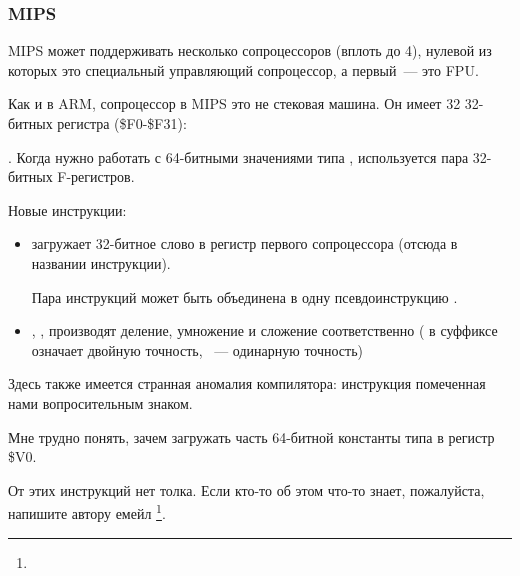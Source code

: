 \subsubsection{MIPS}

MIPS может поддерживать несколько сопроцессоров (вплоть до 4), нулевой из которых это специальный
управляющий сопроцессор, а первый~--- это FPU.

Как и в ARM, сопроцессор в MIPS это не стековая машина. Он имеет 32 32-битных регистра (\$F0-\$F31):

.
Когда нужно работать с 64-битными значениями типа \Tdouble, используется пара 32-битных F-регистров.



Новые инструкции:

\begin{itemize}

\item {} загружает 32-битное слово в регистр первого сопроцессора (отсюда  в названии инструкции).

Пара инструкций  может быть объединена в одну псевдоинструкцию .

\item {}, ,  производят деление, умножение и сложение соответственно 
( в суффиксе означает двойную точность, ~--- одинарную точность)

\end{itemize}

\myindex{\CompilerAnomaly}
\label{MIPS_FPU_LUI}
Здесь также имеется странная аномалия компилятора: инструкция  помеченная нами вопросительным знаком.%

Мне трудно понять, зачем загружать часть 64-битной константы типа \Tdouble в регистр \$V0.

От этих инструкций нет толка.
Если кто-то об этом что-то знает, пожалуйста, напишите автору емейл \footnote{\EMAIL}.

